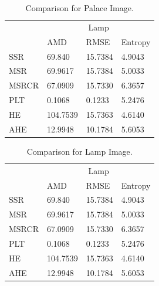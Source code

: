 \begin{table}
	\caption{Comparison for Palace Image.}
    \label{tab:palaceTable}
    \center
    \begin{tabular}{ |p{2cm}||p{2cm}|p{2cm}|p{2cm}|  }

 		\hline
 		\multirow{2}{*}{\rotatebox[origin=c]{0}{Technique}}&\multicolumn{3}{|c|}{Lamp} \\
 		\cline{2-4}
  			&AMD&RMSE&Entropy    \\
 		\hline
 			SSR& 69.840  &15.7384 &4.9043 \\
 		\hline
 			MSR &69.9617 &15.7384 &5.0033  \\
 		\hline
 			MSRCR& 67.0909  &15.7330 &6.3657 \\
 		\hline
 			PLT& 0.1068  &0.1233 &5.2476\\
 		\hline
 			HE& 104.7539  &15.7363 &4.6140 \\
 		\hline
 			AHE& 12.9948  & 10.1784& 5.6053 \\
 		\hline
	\end{tabular}
\end{table}


\begin{table}
	\caption{Comparison for Lamp Image.}
    \label{tab:robotTable}
    \center
    \begin{tabular}{ |p{2cm}||p{2cm}|p{2cm}|p{2cm}|  }

 		\hline
 		\multirow{2}{*}{\rotatebox[origin=c]{0}{Technique}}&\multicolumn{3}{|c|}{Lamp} \\
 		\cline{2-4}
  			&AMD&RMSE&Entropy    \\
 		\hline
 			SSR& 69.840  &15.7384 &4.9043 \\
 		\hline
 			MSR &69.9617 &15.7384 &5.0033  \\
 		\hline
 			MSRCR& 67.0909  &15.7330 &6.3657 \\
 		\hline
 			PLT& 0.1068  &0.1233 &5.2476\\
 		\hline
 			HE& 104.7539  &15.7363 &4.6140 \\
 		\hline
 			AHE& 12.9948  & 10.1784& 5.6053 \\
 		\hline
	\end{tabular}
\end{table}
